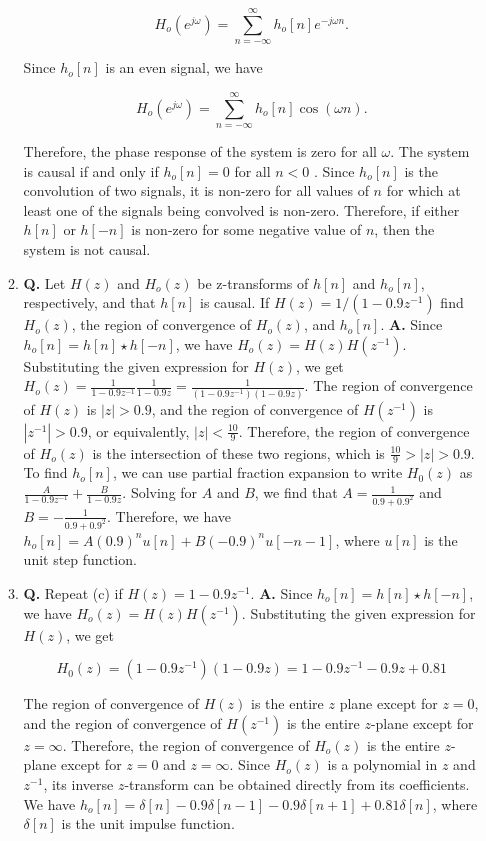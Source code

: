 \documentclass[main.tex]{subfiles}
\begin{document}
\begin{enumerate}
\begin{enumerate}
        $$
        H_o\left(e^{j \omega}\right)=\sum_{n=-\infty}^{\infty} h_o[n] e^{-j \omega n}.
        $$
        
        Since $h_o[n]$ is an even signal, we have 
        
        $$
        H_o\left(e^{j \omega}\right)=\sum_{n=-\infty}^{\infty} h_o[n] \cos (\omega n).
        $$
        
        Therefore, the phase response of the system is zero for all $\omega$. The system is causal if and only if $h_o[n]=0$ for all $n<0$ . Since $h_o[n]$ is the convolution of two signals, it is non-zero for all values of $n$ for which at least one of the signals being convolved is non-zero. Therefore, if either $h[n]$ or $h[-n]$ is non-zero for some negative value of $n$, then the system is not causal.
        
        \item \textbf{Q.} Let $H(z)$ and $H_{o}(z)$ be z-transforms of $h[n]$ and $h_{o}[n]$, respectively, and that $h[n]$ is causal. If $H(z)=1 /\left(1-0.9 z^{-1}\right)$ find $H_{o}(z)$, the region of convergence of $H_{o}(z)$, and $h_{o}[n]$. \textbf{A.} Since $h_o[n]=h[n] \star h[-n]$, we have $H_o(z)=H(z) H\left(z^{-1}\right)$. Substituting the given expression for $H(z)$, we get $H_o(z)=\frac{1}{1-0.9 z^{-1}} \frac{1}{1-0.9 z}=\frac{1}{\left(1-0.9 z^{-1}\right)(1-0.9 z)}$. The region of convergence of $H(z)$ is $|z|>0.9$, and the region of convergence of $H\left(z^{-1}\right)$ is $\left|z^{-1}\right|>0.9$, or equivalently, $|z|<\frac{10}{9}$. Therefore, the region of convergence of $H_o(z)$ is the intersection of these two regions, which is $\frac{10}{9}>|z|>0.9$. To find $h_o[n]$, we can use partial fraction expansion to write $H_0(z)$ as $\frac{A}{1-0.9 z^{-1}}+\frac{B}{1-0.9 z}$. Solving for $A$ and $B$, we find that $A=\frac{1}{0.9+0.9^2}$ and $B=-\frac{1}{0.9+0.9^2}$. Therefore, we have $h_o[n]=A(0.9)^n u[n]+B(-0.9)^n u[-n-1]$, where $u[n]$ is the unit step function.
        
        \item \textbf{Q.} Repeat (c) if $H(z)=1-0.9 z^{-1}$. \textbf{A.} Since $h_o[n]=h[n] \star h[-n]$, we have
        $H_o(z)=H(z) H\left(z^{-1}\right)$. Substituting the given expression for $H(z)$, we get
        
        $$
        H_0(z)=\left(1-0.9 z^{-1}\right)(1-0.9 z)=1-0.9 z^{-1}-0.9 z+0.81
        $$
        
        The region of convergence of $H(z)$ is the entire $z$ plane except for $z=0$, and the region of convergence of $H\left(z^{-1}\right)$ is the entire $z$-plane except for $z=\infty$. Therefore, the region of convergence of $H_o(z)$ is the entire $z$-plane except for $z=0$ and $z=\infty$. Since $H_o(z)$ is a polynomial in $z$ and $z^{-1}$, its inverse $z$-transform can be obtained directly from its coefficients. We have $h_o[n]=\delta[n]-0.9 \delta[n-1]-0.9 \delta[n+1]+0.81 \delta[n]$, where $\delta[n]$ is the unit impulse function.
        

\end{enumerate}
\end{enumerate}
\end{document}
